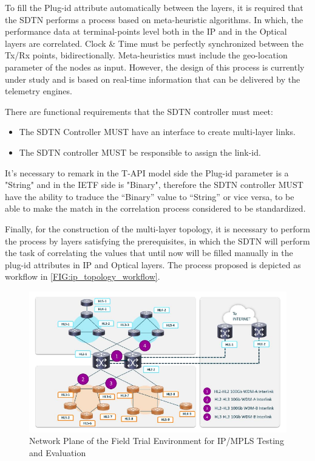 \documentclass[a4paper,fleqn]{cas-dc}
\begin{document}
To fill the Plug-id attribute automatically between the layers, it is required that the SDTN performs a process based on meta-heuristic algorithms. In which, the performance data at terminal-points level both in the IP and in the Optical layers are correlated. Clock \& Time must be perfectly synchronized between the Tx/Rx points, bidirectionally. Meta-heuristics must include the geo-location parameter of the nodes as input. However, the design of this process is currently under study and is based on real-time information that can be delivered by the telemetry engines.

There are functional requirements that the SDTN controller must meet:
\begin{itemize}
    \item The SDTN Controller MUST have an interface to create multi-layer links.
    \item The SDTN controller MUST be responsible to assign the link-id.
\end{itemize}
It’s necessary to remark in the T-API model side the Plug-id parameter is a "String" and in the IETF side is "Binary", therefore the SDTN controller MUST have the ability to traduce the “Binary” value to “String” or vice versa, to be able to make the match in the correlation process considered to be standardized.

Finally, for the construction of the multi-layer topology, it is necessary to perform the process by layers satisfying the prerequisites, in which the SDTN will perform the task of correlating the values that until now will be filled manually in the plug-id attributes in IP and Optical layers. The process proposed is depicted as workflow in \ref{FIG:ip_topology_workflow}.


\begin{figure}
	\centering
		\includegraphics[scale=1]{figs/field_trial_environment_ip.pdf}
	\caption{Network Plane of the Field Trial Environment for IP/MPLS Testing and Evaluation}
	\label{FIG:field_trial_ip}
\end{figure}
\end{document}
